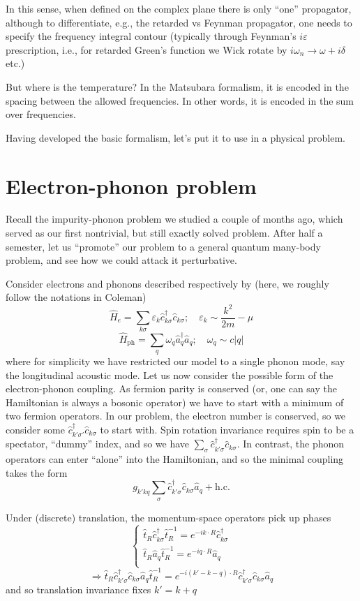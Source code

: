 In this sense, when defined on the complex plane there is only ``one'' propagator, although to differentiate, e.g., the retarded vs Feynman propagator, one needs to specify the frequency integral contour (typically through Feynman's $i\varepsilon$ prescription, i.e., for retarded Green's function we Wick rotate by $i\omega_n\to \omega+i\delta$ etc.)

But where is the temperature? In the Matsubara formalism, it is encoded in the spacing between the allowed frequencies. In other words, it is encoded in the sum over frequencies.

Having developed the basic formalism, let's put it to use in a physical problem.

\section{Electron-phonon problem}

Recall the impurity-phonon problem we studied a couple of months ago, which served as our first nontrivial, but still exactly solved problem. After half a semester, let us ``promote'' our problem to a general quantum many-body problem, and see how we could attack it perturbative.

Consider electrons and phonons described respectively by (here, we roughly follow the notations in Coleman)
\[ \hat{H}_e=\sum_{k\sigma}{\varepsilon _k\hat{c}_{k\sigma}^{\dagger}\hat{c}_{k\sigma}};\quad \varepsilon _k\sim \frac{k^2}{2m}-\mu \]
\[ \hat{H}_{\mathrm{ph}}=\sum_q{\omega _q\hat{a}_{q}^{\dagger}\hat{a}_q};\quad \omega _q\sim c\left| q \right|\]
where for simplicity we have restricted our model to a single phonon mode, say the longitudinal acoustic mode. Let us now consider the possible form of the electron-phonon coupling. As fermion parity is conserved (or, one can say the Hamiltonian is always a bosonic operator) we have to start with a minimum of two fermion operators. In our problem, the electron number is conserved, so we consider some $\hat{c}_{k'\sigma '}^{\dagger}\hat{c}_{k\sigma}$ to start with. Spin rotation invariance requires spin to be a spectator, ``dummy'' index, and so we have $\sum_{\sigma}{\hat{c}_{k'\sigma}^{\dagger}\hat{c}_{k\sigma}}$. In contrast, the phonon operators can enter ``alone'' into the Hamiltonian, and so the minimal coupling takes the form
\[ g_{k'kq}\sum_{\sigma}{\hat{c}_{k'\sigma}^{\dagger}\hat{c}_{k\sigma}}\hat{a}_q+\mathrm{h}.\mathrm{c}.\]

Under (discrete) translation, the momentum-space operators pick up phases
\[ \begin{cases}
	\hat{t}_R\hat{c}_{k\sigma}^{\dagger}\hat{t}_{R}^{-1}=e^{-ik\cdot R}\hat{c}_{k\sigma}^{\dagger}\\
	\hat{t}_R\hat{a}_q\hat{t}_{R}^{-1}=e^{-iq\cdot R}\hat{a}_q\\
\end{cases}\]
\[ \Rightarrow \hat{t}_R\hat{c}_{k'\sigma}^{\dagger}\hat{c}_{k\sigma}\hat{a}_q\hat{t}_{R}^{-1}=e^{-i\left( k'-k-q \right) \cdot R}\hat{c}_{k'\sigma}^{\dagger}\hat{c}_{k\sigma}\hat{a}_q\]
and so translation invariance fixes $k'=k+q$

